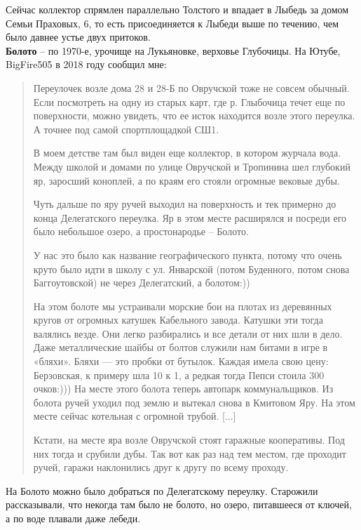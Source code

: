 Сейчас коллектор спрямлен параллельно Толстого и впадает в Лыбедь за домом Семьи Праховых, 6, то есть присоединяется к Лыбеди выше по течению, чем было давнее устье двух притоков.\\

\textbf{Болото} – по 1970-е, урочище на Лукьяновке, верховье Глубочицы. На Ютубе, BigFire505 в 2018 году сообщил мне:

\begin{quotation}
Переулочек возле дома 28 и 28-Б по Овручской тоже не совсем обычный. Если посмотреть на одну из старых карт, где р. Глыбочица течет еще по поверхности, можно увидеть, что ее исток находится возле этого переулка. А точнее под самой спортплощадкой СШ1. 

В моем детстве там был виден еще коллектор, в котором журчала вода. Между школой и домами по улице Овручской и Тропинина шел глубокий яр, заросший коноплей, а по краям его стояли огромные вековые дубы. 

Чуть дальше по яру ручей выходил на поверхность и тек примерно до конца Делегатского переулка. Яр в этом месте расширялся и посреди его было небольшое озеро, а простонародье – Болото. 

У нас это было как название географического пункта, потому что оч\-ень круто было идти в школу с ул. Январской (потом Буденного, потом снова Баггоутовской) не через Делегатский, а болотом:))

На этом болоте мы устраивали морские бои на плотах из деревянных кругов от огромных катушек Кабельного завода. Катушки эти тогда валялись везде. Они легко разбирались и все детали от них шли в дело. Даже металлические шайбы от болтов служили нам битами в игре в «бляхи». Бляхи — это пробки от бутылок. Каждая имела свою цену: Берзовская, к примеру шла 10 к 1, а редкая тогда Пепси стоила 300 очков:))) На месте этого болота теперь автопарк коммунальщиков. Из болота ручей уходил под землю и вытекал снова в Кмитовом Яру. На этом месте сейчас котельная с огромной трубой. [...]

Кстати,  на месте яра возле Овручской стоят гаражные кооперативы. Под них тогда и срубили дубы. Так вот как раз над тем местом, где проходит ручей, гаражи наклонились друг к другу по всему проходу.﻿
\end{quotation} 

На Болото можно было добраться по Делегатскому переулку. Старожили рассказывали, что некогда там было не болото, но озеро, питавшееся от ключей, а по воде плавали даже лебеди.\\


